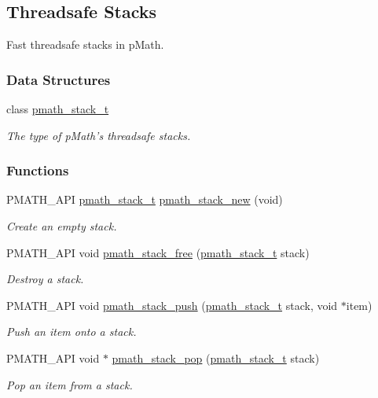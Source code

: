 \hypertarget{group__stacks}{
\subsection{Threadsafe Stacks}
\label{group__stacks}
}
Fast threadsafe stacks in pMath.  


\subsubsection*{Data Structures}
\begin{CompactItemize}
\item 
class \hyperlink{classpmath__stack__t}{pmath\_\-stack\_\-t}
\begin{CompactList}\small\item\em The type of pMath's threadsafe stacks. \item\end{CompactList}\end{CompactItemize}
\subsubsection*{Functions}
\begin{CompactItemize}
\item 
PMATH\_\-API \hyperlink{classpmath__stack__t}{pmath\_\-stack\_\-t} \hyperlink{group__stacks_g4a549111f394261de5ac3cc3acda428b}{pmath\_\-stack\_\-new} (void)
\begin{CompactList}\small\item\em Create an empty stack. \item\end{CompactList}\item 
PMATH\_\-API void \hyperlink{group__stacks_gc681555957545245455f2a0ac97e3828}{pmath\_\-stack\_\-free} (\hyperlink{classpmath__stack__t}{pmath\_\-stack\_\-t} stack)
\begin{CompactList}\small\item\em Destroy a stack. \item\end{CompactList}\item 
PMATH\_\-API void \hyperlink{group__stacks_g56988223111a61b5b46f719e0efd546f}{pmath\_\-stack\_\-push} (\hyperlink{classpmath__stack__t}{pmath\_\-stack\_\-t} stack, void $\ast$item)
\begin{CompactList}\small\item\em Push an item onto a stack. \item\end{CompactList}\item 
PMATH\_\-API void $\ast$ \hyperlink{group__stacks_g45bcd2d27a9beb76949c1283b6367dab}{pmath\_\-stack\_\-pop} (\hyperlink{classpmath__stack__t}{pmath\_\-stack\_\-t} stack)
\begin{CompactList}\small\item\em Pop an item from a stack. \item\end{CompactList}\end{CompactItemize}


